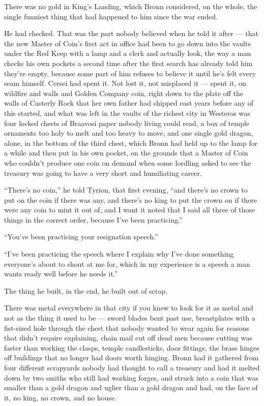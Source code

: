 There was no gold in King’s Landing, which Bronn considered, on the whole, the single funniest thing that had happened to him since the war ended.

He had checked. That was the part nobody believed when he told it after — that the new Master of Coin’s first act in office had been to go down into the vaults under the Red Keep with a lamp and a clerk and actually look, the way a man checks his own pockets a second time after the first search has already told him they’re empty, because some part of him refuses to believe it until he’s felt every seam himself. Cersei had spent it. Not lost it, not misplaced it — spent it, on wildfire and walls and Golden Company coin, right down to the plate off the walls of Casterly Rock that her own father had shipped east years before any of this started, and what was left in the vaults of the richest city in Westeros was four locked chests of Braavosi paper nobody living could read, a box of temple ornaments too holy to melt and too heavy to move, and one single gold dragon, alone, in the bottom of the third chest, which Bronn had held up to the lamp for a while and then put in his own pocket, on the grounds that a Master of Coin who couldn’t produce one coin on demand when some lordling asked to see the treasury was going to have a very short and humiliating career.

“There’s no coin,” he told Tyrion, that first evening, “and there’s no crown to put on the coin if there was any, and there’s no king to put the crown on if there were any coin to mint it out of, and I want it noted that I said all three of those things in the correct order, because I’ve been practicing.”

“You’ve been practicing your resignation speech.”

“I’ve been practicing the speech where I explain why I’ve done something everyone’s about to shout at me for, which in my experience is a speech a man wants ready well before he needs it.”

\sceneBreak

The thing he built, in the end, he built out of scrap.

There was metal everywhere in that city if you knew to look for it as metal and not as the thing it used to be — sword blades bent past use, breastplates with a fist-sized hole through the chest that nobody wanted to wear again for reasons that didn’t require explaining, chain mail cut off dead men because cutting was faster than working the clasps, temple candlesticks, door fittings, the brass hinges off buildings that no longer had doors worth hinging. Bronn had it gathered from four different scrapyards nobody had thought to call a treasury and had it melted down by two smiths who still had working forges, and struck into a coin that was smaller than a gold dragon and uglier than a gold dragon and had, on the face of it, no king, no crown, and no house.

